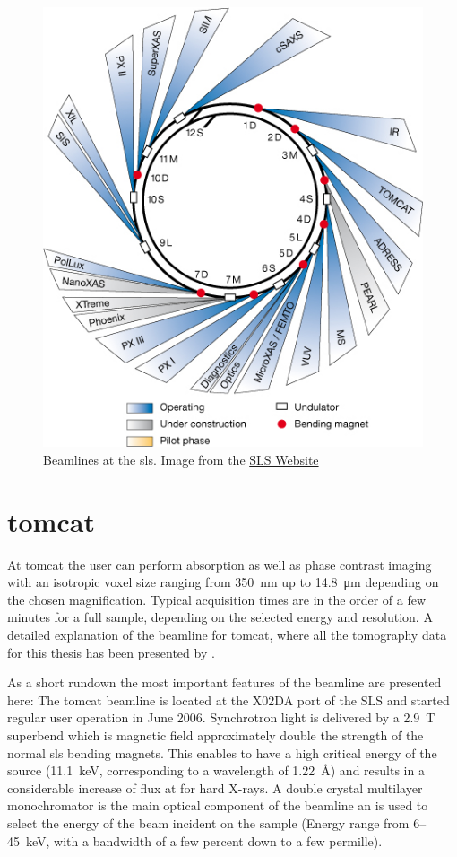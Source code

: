 \renewcommand{\imsize}{0.618\linewidth}%
\begin{figure}[htb]
	\centering
	\includegraphics[width=\imsize]{img/SLS_beamlines_2008}
	\caption[Beamlines at the Swiss Light Source]{Beamlines at the \ac{sls}. Image from the \href{http://sls.web.psi.ch/view.php/beamlines/}{SLS Website}}
	\label{fig:beamlines}
\end{figure}

\section{tomcat}\label{sec:tomcat}
At \acf{tomcat} the user can perform absorption as well as phase contrast imaging with an isotropic voxel size ranging from \SI{350}{\nano\meter} up to \SI{14.8}{\micro\meter} depending on the chosen magnification. Typical acquisition times are in the order of a few minutes for a full sample, depending on the selected energy and resolution. A detailed explanation of the beamline for \ac{tomcat}, where all the tomography data for this thesis has been presented by \citet{Stampanoni2006a}.

As a short rundown the most important features of the beamline are presented here: The \ac{tomcat} beamline is located at the X02DA port of the SLS and started regular user operation in June 2006. Synchrotron light is delivered by a \SI{2.9}{\tesla} superbend which is magnetic field approximately double the strength of the normal \ac{sls} bending magnets. This enables to have a high critical energy of the source (\SI{11.1}{\kilo\electronvolt}, corresponding to a wavelength of \SI{1.22}{\angstrom}) and results in a considerable increase of flux at for hard X-rays. A double crystal multilayer monochromator is the main optical component of the beamline an is used to select the energy of the beam incident on the sample (Energy range from 6--\SI{45}{\kilo\electronvolt}, with a bandwidth of a few percent down to a few permille).


